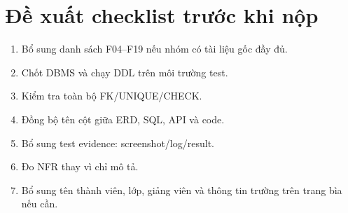 \section{Đề xuất checklist trước khi nộp}
\begin{enumerate}
  \item Bổ sung danh sách F04--F19 nếu nhóm có tài liệu gốc đầy đủ.
  \item Chốt DBMS và chạy DDL trên môi trường test.
  \item Kiểm tra toàn bộ FK/UNIQUE/CHECK.
  \item Đồng bộ tên cột giữa ERD, SQL, API và code.
  \item Bổ sung test evidence: screenshot/log/result.
  \item Đo NFR thay vì chỉ mô tả.
  \item Bổ sung tên thành viên, lớp, giảng viên và thông tin trường trên trang bìa nếu cần.
\end{enumerate}
